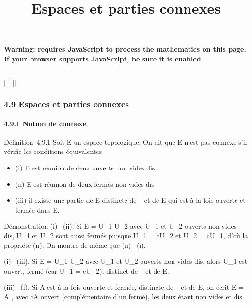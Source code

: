 \documentclass[]{article}
\title{Espaces et parties connexes}
\author{}
\date{}
\begin{document}
\maketitle

\textbf{Warning: 
requires JavaScript to process the mathematics on this page.\\ If your
browser supports JavaScript, be sure it is enabled.}

\begin{center}\rule{3in}{0.4pt}\end{center}

{[}
{[}
{[}{]}
{[}

\subsubsection{4.9 Espaces et parties connexes}

\paragraph{4.9.1 Notion de connexe}

Définition~4.9.1 Soit E un espace topologique. On dit que E n'est pas
connexe s'il vérifie les conditions équivalentes

\begin{itemize}
\itemsep1pt\parskip0pt
\item
  (i) E est réunion de deux ouverts non vides dis\jmathoints
\item
  (ii) E est réunion de deux fermés non vides dis\jmathoints
\item
  (iii) il existe une partie de E distincte de \varnothing~ et de E qui est à la
  fois ouverte et fermée dans E.
\end{itemize}

Démonstration (i) \rigtharrow~(ii). Si E = U\_1 \cup U\_2 avec
U\_1 et U\_2 ouverts non vides dis\jmathoints, U\_1
et U\_2 sont aussi fermés puisque U\_1 = cU\_2
et U\_2 = cU\_1, d'où la propriété (ii). On montre de
même que (ii) \rigtharrow~(i).

(i) \rigtharrow~(iii). Si E = U\_1 \cup U\_2 avec U\_1 et
U\_2 ouverts non vides dis\jmathoints, alors U\_1 est ouvert,
fermé (car U\_1 = cU\_2), distinct de \varnothing~ et de E.

(iii) \rigtharrow~(i). Si A est à la fois ouverte et fermée, distincte de \varnothing~ et de
E, on écrit E = A \cupcA, avec cA ouvert (complémentaire d'un fermé), les
deux étant non vides et dis\jmathoints.
\end{document}
